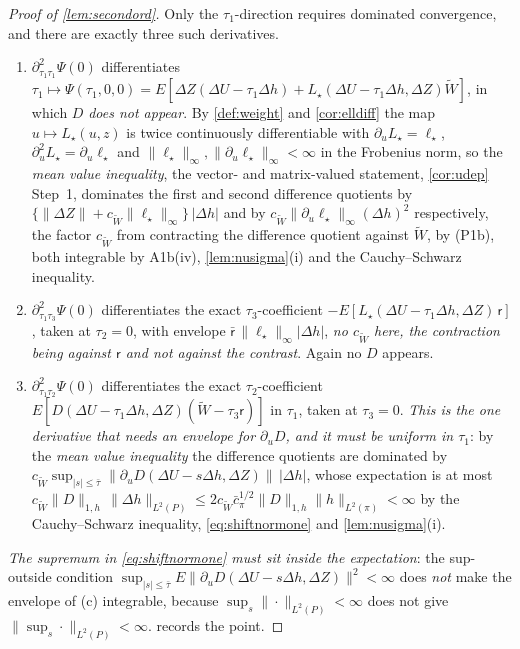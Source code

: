 \begin{proof}[Proof of \cref{lem:secondord}]
Only the $\tau_1$-direction requires dominated convergence, and there are exactly three such
derivatives.
\begin{enumerate}
\item[(a)] $\partial^{2}_{\tau_1\tau_1}\Psi(0)$ differentiates
$\tau_1\mapsto\Psi(\tau_1,0,0)=E[\Delta Z(\Delta U-\tau_1\Delta h)+L_\star(\Delta U-\tau_1\Delta h,\Delta Z)\widetilde W]$,
in which $D$ \emph{does not appear}. By \cref{def:weight} and \cref{cor:elldiff} the map
$u\mapsto L_\star(u,z)$ is twice continuously differentiable with $\partial_uL_\star=\ell_\star$,
$\partial^{2}_uL_\star=\partial_u\ell_\star$ and $\|\ell_\star\|_\infty,\|\partial_u\ell_\star\|_\infty<\infty$
in the Frobenius norm,
so the \emph{mean value inequality}, the vector- and matrix-valued statement, \cref{cor:udep} Step~1, 
dominates the first and second difference quotients by
$\{\|\Delta Z\|+c_{\widetilde W}\|\ell_\star\|_\infty\}\,|\Delta h|$ and by
$c_{\widetilde W}\|\partial_u\ell_\star\|_\infty(\Delta h)^{2}$
respectively, the factor $c_{\widetilde W}$ from contracting the difference quotient against
$\widetilde W$, by \textup{(P1b)}, both integrable by A1b(iv), \cref{lem:nusigma}(i) and the
Cauchy--Schwarz inequality.
\item[(b)] $\partial^{2}_{\tau_1\tau_3}\Psi(0)$ differentiates the exact $\tau_3$-coefficient
$-E[L_\star(\Delta U-\tau_1\Delta h,\Delta Z)\,\mathsf r]$, taken at $\tau_2=0$, with envelope
$\bar{\mathsf r}\,\|\ell_\star\|_\infty|\Delta h|$, \emph{no $c_{\widetilde W}$ here, the contraction
being against $\mathsf r$ and not against the contrast}. Again no $D$ appears.
\item[(c)] $\partial^{2}_{\tau_1\tau_2}\Psi(0)$ differentiates the exact $\tau_2$-coefficient
$E[D(\Delta U-\tau_1\Delta h,\Delta Z)(\widetilde W-\tau_3\mathsf r)]$ in $\tau_1$, taken at $\tau_3=0$.
\emph{This is the one derivative that needs an envelope for $\partial_uD$, and it must be uniform in
$\tau_1$}: by the \emph{mean value inequality} the difference quotients are dominated by
$c_{\widetilde W}\sup_{|s|\le\bar\tau}\|\partial_uD(\Delta U-s\Delta h,\Delta Z)\|\,|\Delta h|$, whose
expectation is at
most $c_{\widetilde W}\|D\|_{1,h}\,\|\Delta h\|_{L^{2}(P)}\le2c_{\widetilde W}\bar c_\pi^{1/2}\|D\|_{1,h}\|h\|_{L^{2}(\pi)}<\infty$
by the
Cauchy--Schwarz inequality, \eqref{eq:shiftnormone} and \cref{lem:nusigma}(i).
\end{enumerate}
\emph{The supremum in \eqref{eq:shiftnormone} must sit
inside the expectation}: the sup-outside condition
$\sup_{|s|\le\bar\tau}E\|\partial_uD(\Delta U-s\Delta h,\Delta Z)\|^{2}<\infty$ does \emph{not} make the
envelope of (c) integrable, because $\sup_s\|\cdot\|_{L^{2}(P)}<\infty$ does not give
$\|\sup_s\cdot\|_{L^{2}(P)}<\infty$.  records the point.


\end{proof}
